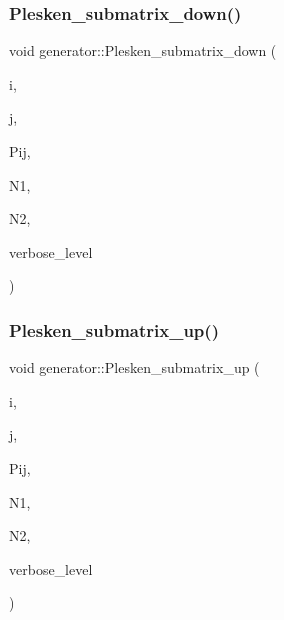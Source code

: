 \subsubsection{\texorpdfstring{Plesken\+\_\+submatrix\+\_\+down()}{Plesken\_submatrix\_down()}}
{\footnotesize\ttfamily void generator\+::\+Plesken\+\_\+submatrix\+\_\+down (\begin{DoxyParamCaption}\item[{\mbox{\hyperlink{galois_8h_a09fddde158a3a20bd2dcadb609de11dc}{I\+NT}}}]{i,  }\item[{\mbox{\hyperlink{galois_8h_a09fddde158a3a20bd2dcadb609de11dc}{I\+NT}}}]{j,  }\item[{\mbox{\hyperlink{galois_8h_a09fddde158a3a20bd2dcadb609de11dc}{I\+NT}} $\ast$\&}]{Pij,  }\item[{\mbox{\hyperlink{galois_8h_a09fddde158a3a20bd2dcadb609de11dc}{I\+NT}} \&}]{N1,  }\item[{\mbox{\hyperlink{galois_8h_a09fddde158a3a20bd2dcadb609de11dc}{I\+NT}} \&}]{N2,  }\item[{\mbox{\hyperlink{galois_8h_a09fddde158a3a20bd2dcadb609de11dc}{I\+NT}}}]{verbose\+\_\+level }\end{DoxyParamCaption})}

\mbox{\label{classgenerator_ad3d2ebc7da6268d878c5acfc5feefca5}} 
\subsubsection{\texorpdfstring{Plesken\+\_\+submatrix\+\_\+up()}{Plesken\_submatrix\_up()}}
{\footnotesize\ttfamily void generator\+::\+Plesken\+\_\+submatrix\+\_\+up (\begin{DoxyParamCaption}\item[{\mbox{\hyperlink{galois_8h_a09fddde158a3a20bd2dcadb609de11dc}{I\+NT}}}]{i,  }\item[{\mbox{\hyperlink{galois_8h_a09fddde158a3a20bd2dcadb609de11dc}{I\+NT}}}]{j,  }\item[{\mbox{\hyperlink{galois_8h_a09fddde158a3a20bd2dcadb609de11dc}{I\+NT}} $\ast$\&}]{Pij,  }\item[{\mbox{\hyperlink{galois_8h_a09fddde158a3a20bd2dcadb609de11dc}{I\+NT}} \&}]{N1,  }\item[{\mbox{\hyperlink{galois_8h_a09fddde158a3a20bd2dcadb609de11dc}{I\+NT}} \&}]{N2,  }\item[{\mbox{\hyperlink{galois_8h_a09fddde158a3a20bd2dcadb609de11dc}{I\+NT}}}]{verbose\+\_\+level }\end{DoxyParamCaption})}

